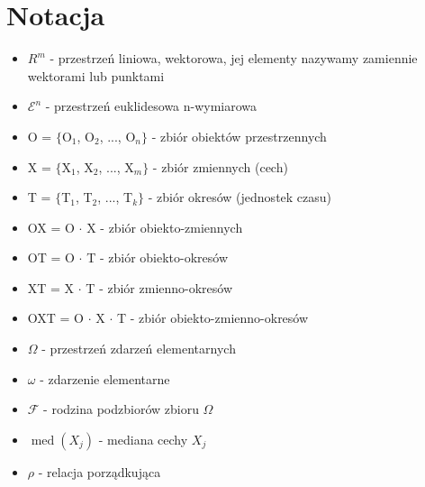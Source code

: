 \documentclass[12pt,a4paper]{report}
\newcommand{\mediana}{\operatorname{med}}
\begin{document}
\section{Notacja}   
\begin{itemize}
\item $R^m$ - przestrzeń liniowa, wektorowa, jej elementy nazywamy zamiennie wektorami lub punktami
\item $\mathcal{E}^n$ - przestrzeń euklidesowa n-wymiarowa
\item O = $\{$O$_{1}$, O$_{2}$, ..., O$_{n}\}$ - zbiór obiektów przestrzennych
\item X = $\{$X$_{1}$, X$_{2}$, ..., X$_{m}\}$ - zbiór zmiennych (cech)
\item T = $\{$T$_{1}$, T$_{2}$, ..., T$_{k}\}$ - zbiór okresów (jednostek czasu)
\item OX = O $\cdot$ X - zbiór obiekto-zmiennych 
\item OT = O $\cdot$ T - zbiór obiekto-okresów
\item XT = X $\cdot$ T - zbiór zmienno-okresów
\item OXT = O $\cdot$ X $\cdot$ T - zbiór obiekto-zmienno-okresów
\item $\Omega$ - przestrzeń zdarzeń elementarnych
\item $\omega$ - zdarzenie elementarne 
\item $\mathcal{F}$ - rodzina podzbiorów zbioru $\Omega$
\item $\mediana (X_{j})$ - mediana cechy $X_{j}$
\item $\rho$ - relacja porządkująca


\end{itemize}
\newpage
\end{document}
